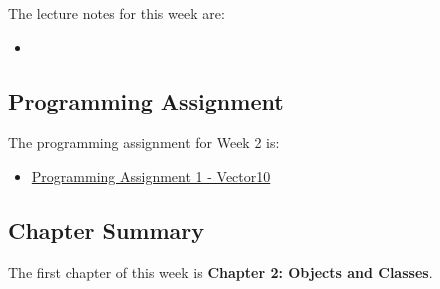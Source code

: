 \noindent The lecture notes for this week are:

\begin{itemize}
    \item {}
\end{itemize}

\subsection{Programming Assignment}

The programming assignment for Week 2 is:

\begin{itemize}
    \item \href{https://github.com/QuantumCompiler/CU/tree/main/CSPB%202270%20-%20Data%20Structures/Assignments/Assignment%201%20-%20Vector10}{Programming Assignment 1 - Vector10}
\end{itemize}

\subsection{Chapter Summary}

The first chapter of this week is \textbf{Chapter 2: Objects and Classes}.

